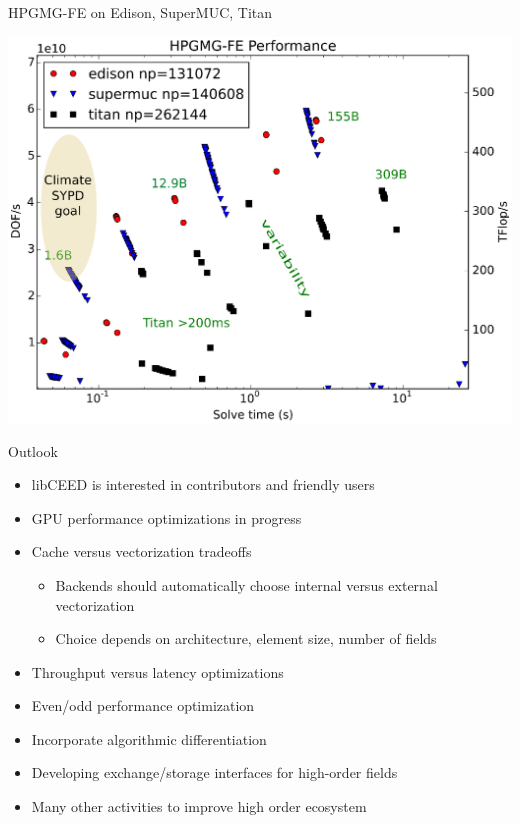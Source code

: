 \documentclass[aspectratio=169]{beamer}
\begin{document}
\begin{frame}{HPGMG-FE on Edison, SuperMUC, Titan}
  \begin{center}
    \vspace{-1em}
    \includegraphics[trim=0 10 0 20,clip,width=.8\textwidth]{figures/hpgmg/range-edison-supermuc-titan-ann2.eps}
  \end{center}
\end{frame}

\begin{frame}{Outlook}
  \begin{itemize}
  \item libCEED is interested in contributors and friendly users
  \item GPU performance optimizations in progress
  \item Cache versus vectorization tradeoffs
    \begin{itemize}
    \item Backends should automatically choose internal versus external vectorization
    \item Choice depends on architecture, element size, number of fields
    \end{itemize}
  \item Throughput versus latency optimizations
  \item Even/odd performance optimization
  \item Incorporate algorithmic differentiation
  \item Developing exchange/storage interfaces for high-order fields
  \item Many other activities to improve high order ecosystem
  \end{itemize}
\end{frame}
\end{document}
